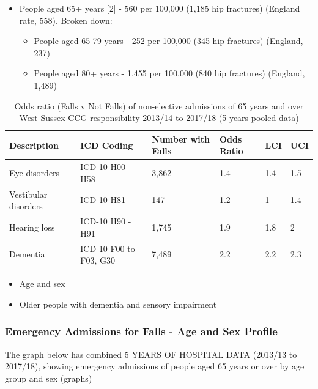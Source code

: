 \begin{itemize}[noitemsep]
    \item People aged 65+ years [2] - 560 per 100,000 (1,185 hip fractures) (England rate, 558). Broken down:
    \begin{itemize}[noitemsep]
        \item People aged 65-79 years - 252 per 100,000 (345 hip fractures) (England, 237)
        \item People aged 80+ years - 1,455 per 100,000 (840 hip fractures) (England, 1,489)
    \end{itemize}
\end{itemize}

\begin{table}
    \caption{Odds ratio (Falls v Not Falls) of non-elective admissions of 65 years and over West Sussex CCG responsibility 2013/14 to 2017/18 (5 years pooled data)}
    \centering
    \begin{tabular}{llllll}
        \toprule
        Description & ICD Coding & Number with Falls & Odds Ratio & LCI & UCI \\
        \midrule
        Eye disorders & ICD-10 H00 - H58 & 3,862 & 1.4 & 1.4 & 1.5 \\
        Vestibular disorders & ICD-10 H81 & 147 & 1.2 & 1 & 1.4 \\
        Hearing loss & ICD-10 H90 - H91 & 1,745 & 1.9 & 1.8 & 2 \\
        Dementia & ICD-10 F00 to F03, G30 & 7,489 & 2.2 & 2.2 & 2.3 \\
        \bottomrule
    \end{tabular}
    \label{tab:op:f_vs_nf}
\end{table}

\begin{tcolorbox}[colback={boxcolour},title={Key risk factors}]
    \begin{itemize}[noitemsep]
        \item Age and sex
        \item Older people with dementia and sensory impairment
    \end{itemize}
\end{tcolorbox}
    
\subsubsection{Emergency Admissions for Falls - Age and Sex Profile} The graph below has combined 5 YEARS OF HOSPITAL DATA (2013/13 to 2017/18), showing emergency admissions of people aged 65 years or over by age group and sex (graphs)

